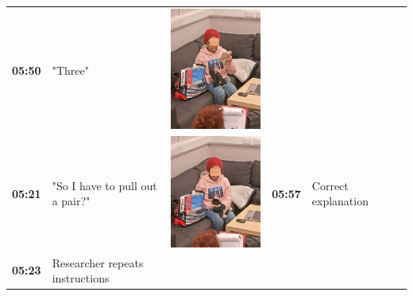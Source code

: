 \documentclass[twocolumn, serif, empirical, authordate]{jote-article}
\begin{document}
\begin{table}[ht!]
\begin{mdframed}[linecolor=jotedark]
\begin{tabularx}{\linewidth}{@{} m{.05\linewidth} m{.2\linewidth} >{\raggedleft\arraybackslash}m{.19\linewidth}  m{.05\linewidth} m{.2\linewidth} >{\raggedleft\arraybackslash}m{.19\linewidth} }
  \textbf{05:50} & "Three" & \includegraphics[height=.15\textheight, width=.8\linewidth]{media/image13.png} \\
 \textbf{05:21} & "So I have to pull out a pair?" & \includegraphics[height=.15\textheight, width=.8\linewidth]{media/image9.png} &
 \textbf{05:57} & Correct explanation & \\
 \textbf{05:23} & Researcher repeats instructions & \\ 


\end{tabularx}
\end{mdframed}
\end{table}
\end{document}
